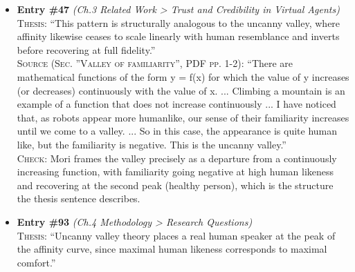\documentclass[11pt, a4paper]{article}
\begin{document}
\begin{itemize}[leftmargin=1.2em,itemsep=4pt]
\textsc{Thesis:} ``The solid curve describes affective response to still figures, while the dashed curve describes figures in motion.''\\
\textsc{Source (Figure 1 legend, PDF p. 1; body sentence in Sec. ”The effects of movement”, PDF p. 2):} ``[Fig. 1 key, upper left] ”moving” (dashed line) / ”still” (solid line); [y-axis] ”familiarity”; [x-axis] ”human likeness”. [Body text] As shown in Figure 1, adding movement changes the shape of the uncanny valley by exaggerating the peaks and valley.''\\
\textsc{Check:} The figure key in this translation explicitly pairs a dashed line with ”moving” and a solid line with ”still”, and the accompanying text confirms the dashed curve is the movement condition with exaggerated peaks and valley. The bracketed labels mark figure elements; the quoted words are the verbatim legend and axis labels, which pdftotext cannot extract since the figure is an image.
\item \textbf{Entry \#47} \textit{(Ch.3 Related Work > Trust and Credibility in Virtual Agents)}\\
\textsc{Thesis:} ``This pattern is structurally analogous to the uncanny valley, where affinity likewise ceases to scale linearly with human resemblance and inverts before recovering at full fidelity.''\\
\textsc{Source (Sec. ”Valley of familiarity”, PDF pp. 1-2):} ``There are mathematical functions of the form y = f(x) for which the value of y increases (or decreases) continuously with the value of x. ... Climbing a mountain is an example of a function that does not increase continuously ... I have noticed that, as robots appear more humanlike, our sense of their familiarity increases until we come to a valley. ... So in this case, the appearance is quite human like, but the familiarity is negative. This is the uncanny valley.''\\
\textsc{Check:} Mori frames the valley precisely as a departure from a continuously increasing function, with familiarity going negative at high human likeness and recovering at the second peak (healthy person), which is the structure the thesis sentence describes.
\item \textbf{Entry \#93} \textit{(Ch.4 Methodology > Research Questions)}\\
\textsc{Thesis:} ``Uncanny valley theory places a real human speaker at the peak of the affinity curve, since maximal human likeness corresponds to maximal comfort.''\\

\end{itemize}
\end{document}

